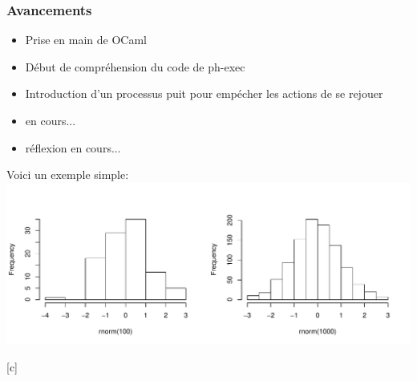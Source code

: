 
\begin{frame}[c]
  \frametitle{Avancements}
 
 
\pause
\begin{itemize}
  \item Prise en main de OCaml
  \item Début de compréhension du code de ph-exec
  \item Introduction d'un processus puit pour empécher les actions de se rejouer
\end{itemize}

\begin{itemize}
 \item en cours...
\end{itemize}

\begin{itemize}
 \item réflexion en cours...
\end{itemize}



\end{frame}


\begin{frame}[c]

Voici un exemple simple:
\includegraphics{avancement020414-exemple}

\end{frame}[c]

